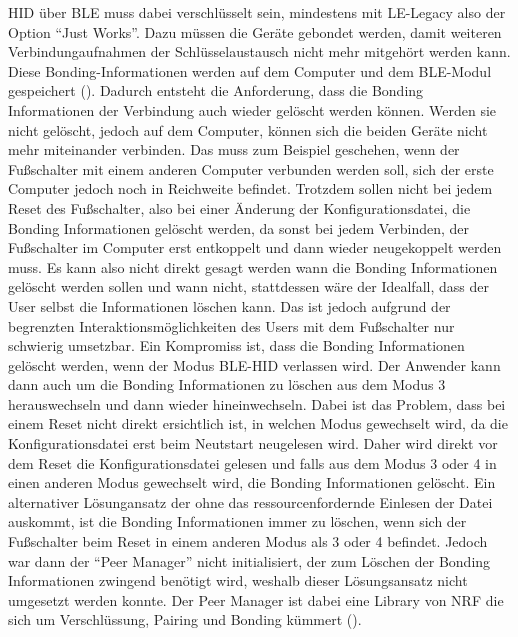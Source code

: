 HID über BLE muss dabei verschlüsselt sein, mindestens mit LE-Legacy also der Option ``Just Works''. Dazu müssen die Geräte gebondet werden, damit weiteren Verbindungaufnahmen der Schlüsselaustausch nicht mehr mitgehört werden kann. Diese Bonding-Informationen werden auf dem Computer und dem \ac{BLE}-Modul gespeichert (\cite[78]{HID_BLE_Specification}). Dadurch entsteht die Anforderung, dass die Bonding Informationen der Verbindung auch wieder gelöscht werden können. Werden sie nicht gelöscht, jedoch auf dem Computer, können sich die beiden Geräte nicht mehr miteinander verbinden. Das muss zum Beispiel geschehen, wenn der Fußschalter mit einem anderen Computer verbunden werden soll, sich der erste Computer jedoch noch in Reichweite befindet. Trotzdem sollen nicht bei jedem Reset des Fußschalter, also bei einer Änderung der Konfigurationsdatei, die Bonding Informationen gelöscht werden, da sonst bei jedem Verbinden, der Fußschalter im Computer erst entkoppelt und dann wieder neugekoppelt werden muss. Es kann also nicht direkt gesagt werden wann die Bonding Informationen gelöscht werden sollen und wann nicht, stattdessen wäre der Idealfall, dass der User selbst die Informationen löschen kann. Das ist jedoch aufgrund der begrenzten Interaktionsmöglichkeiten des Users mit dem Fußschalter nur schwierig umsetzbar. Ein Kompromiss ist, dass die Bonding Informationen gelöscht werden, wenn der Modus \ac{BLE}-\ac{HID} verlassen wird. Der Anwender kann dann auch um die Bonding Informationen zu löschen aus dem Modus 3 herauswechseln und dann wieder hineinwechseln. Dabei ist das Problem, dass bei einem Reset nicht direkt ersichtlich ist, in welchen Modus gewechselt wird, da die Konfigurationsdatei erst beim Neutstart neugelesen wird. Daher wird direkt vor dem Reset die Konfigurationsdatei gelesen und falls aus dem Modus 3 oder 4 in einen anderen Modus gewechselt wird, die Bonding Informationen gelöscht. Ein alternativer Lösungansatz der ohne das ressourcenfordernde Einlesen der Datei auskommt, ist die Bonding Informationen immer zu löschen, wenn sich der Fußschalter beim Reset in einem anderen Modus als 3 oder 4 befindet. Jedoch war dann der ``Peer Manager'' nicht initialisiert, der zum Löschen der Bonding Informationen zwingend benötigt wird, weshalb dieser Lösungsansatz nicht umgesetzt werden konnte. Der Peer Manager ist dabei eine Library von NRF die sich um Verschlüssung, Pairing und Bonding kümmert (\cite[]{NRF_PeerManager}).\\
